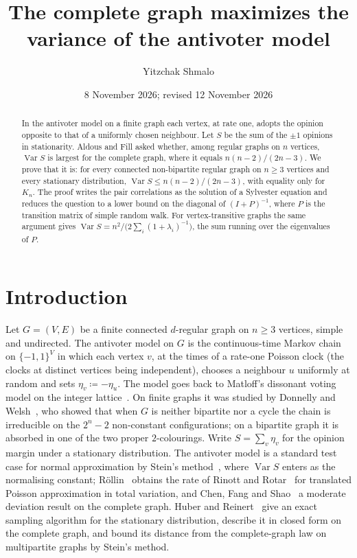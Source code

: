 \documentclass[11pt]{amsart}
\title[The antivoter variance]{The complete graph maximizes the variance of the antivoter model}
\author{Yitzchak Shmalo}
\date{8 November 2026; revised 12 November 2026}
\theoremstyle{remark}
\numberwithin{equation}{section}
\DeclareMathOperator{\Var}{Var}
\begin{document}
\begin{abstract}
In the antivoter model on a finite graph each vertex, at rate one, adopts the opinion opposite to that of a uniformly
chosen neighbour. Let $S$ be the sum of the $\pm1$ opinions in stationarity. Aldous and Fill asked whether, among
regular graphs on $n$ vertices, $\Var S$ is largest for the complete graph, where it equals $n(n-2)/(2n-3)$. We prove
that it is: for every connected non-bipartite regular graph on $n\ge3$ vertices and every stationary distribution,
$\Var S\le n(n-2)/(2n-3)$, with equality only for $K_n$. The proof writes the pair correlations as the solution of a
Sylvester equation and reduces the question to a lower bound on the diagonal of $(I+P)^{-1}$, where $P$ is the
transition matrix of simple random walk. For vertex-transitive graphs the same argument gives
$\Var S=n^2/\bigl(2\sum_i(1+\lambda_i)^{-1}\bigr)$, the sum running over the eigenvalues of $P$.
\end{abstract}

\maketitle

\section{Introduction}

Let $G=(V,E)$ be a finite connected $d$-regular graph on $n\ge3$ vertices, simple and undirected. The antivoter model on $G$ is the
continuous-time Markov chain on $\{-1,1\}^V$ in which each vertex $v$, at the times of a rate-one Poisson clock (the clocks at distinct vertices being independent),
chooses a neighbour $u$ uniformly at random and sets $\eta_v\coloneqq-\eta_u$. The model goes back to Matloff's
dissonant voting model on the integer lattice~\cite{Matloff}. On finite graphs it was studied by
Donnelly and Welsh~\cite{DW}, who showed that when $G$ is neither bipartite nor a cycle the chain is
irreducible on the $2^n-2$ non-constant configurations; on a bipartite graph it is absorbed in one of the two proper
$2$-colourings. Write $S=\sum_v\eta_v$ for the opinion margin under a stationary distribution. The antivoter model is a
standard test case for normal approximation by Stein's method~\cite{RR,Ross}, where $\Var S$ enters as the
normalising constant; R\"ollin~\cite{Rol} obtains the rate of Rinott and Rotar~\cite{RR} for translated Poisson
approximation in total variation, and Chen, Fang and Shao~\cite{CFS} a moderate deviation result on the complete graph. Huber and Reinert~\cite{HR} give an exact sampling algorithm for the stationary distribution,
describe it in closed form on the complete graph, and bound its distance from the complete-graph law on multipartite
graphs by Stein's method.
\end{document}
